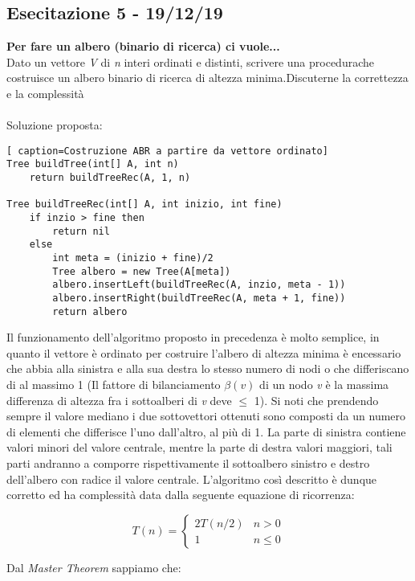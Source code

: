 \documentclass[../cheatSheetAlgoritmi.tex]{subfiles}
\begin{document}
\subsection{Esecitazione 5 - 19/12/19}
\textbf{Per fare un albero (binario di ricerca) ci vuole...}\\
Dato un vettore \textit{V} di \textit{n} interi ordinati e distinti, scrivere una procedurache costruisce un albero binario di ricerca di altezza minima.Discuterne la correttezza e la complessità
\\\\
Soluzione proposta:
\begin{lstlisting}[ caption=Costruzione ABR a partire da vettore ordinato]
Tree buildTree(int[] A, int n)
	return buildTreeRec(A, 1, n)

Tree buildTreeRec(int[] A, int inizio, int fine)
	if inzio > fine then 
    	return nil
  	else
    	int meta = (inizio + fine)/2
    	Tree albero = new Tree(A[meta])
    	albero.insertLeft(buildTreeRec(A, inzio, meta - 1))
    	albero.insertRight(buildTreeRec(A, meta + 1, fine))
    	return albero
\end{lstlisting}
Il funzionamento dell'algoritmo proposto in precedenza è molto semplice, in quanto il vettore è ordinato per costruire l'albero di altezza minima è encessario che abbia alla sinistra e alla sua destra lo stesso numero di nodi o che differiscano di al massimo 1 (Il fattore di bilanciamento $\beta(v)$ di un nodo \textit{v} è la massima differenza
di altezza fra i sottoalberi di \textit{v} deve $\leq$ 1). Si noti che prendendo sempre il valore mediano i due sottovettori ottenuti sono composti da un numero di elementi che differisce l'uno dall'altro, al più di 1. La parte di sinistra contiene valori minori del valore centrale, mentre la parte di destra valori maggiori, tali parti andranno a comporre rispettivamente il sottoalbero sinistro e destro dell'albero con radice il valore centrale.
L'algoritmo così descritto è dunque corretto ed ha complessità data dalla seguente equazione di ricorrenza:
\begin{center}
	\begin{equation*}
  		T(n)=\begin{cases}
    		2T(n/2)  & \text{$n > 0$}\\
    		1 & \text{$n \leq 0$}
  		\end{cases}
	\end{equation*}
\end{center}
Dal \textit{Master Theorem} sappiamo che:\\
\end{document}
